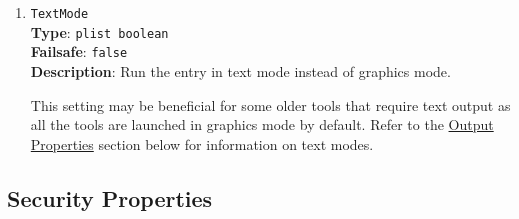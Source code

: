 \documentclass[]{article}
\begin{document}
\begin{enumerate}
  \emph{Note}: This option is only valid for \texttt{Tools} and cannot be
  specified for \texttt{Entries} (is always \texttt{true}).

\item
  \texttt{TextMode}\\
  \textbf{Type}: \texttt{plist\ boolean}\\
  \textbf{Failsafe}: \texttt{false}\\
  \textbf{Description}: Run the entry in text mode instead of graphics mode.

  This setting may be beneficial for some older tools that require text output
  as all the tools are launched in graphics mode by default. Refer to the
  \hyperref[uefioutputprops]{Output Properties} section below for information on text modes.

\end{enumerate}

\subsection{Security Properties}\label{miscsecurityprops}
\end{document}
